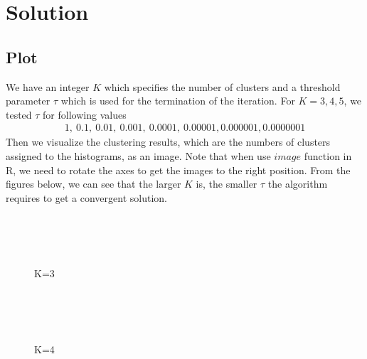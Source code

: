 \documentclass[letterpaper,hidelinks]{article}
\numberwithin{equation}{section}
\begin{document}
\section{Solution}
\subsection{Plot}
We have an integer $K$ which specifies the number of clusters and a threshold parameter $\tau$ which is used for the termination of the iteration. For $K=3,4,5$, we tested $\tau$ for following values
\begin{align}
1,~0.1,~0.01,~0.001,~0.0001,~0.00001,0.000001,0.0000001
\end{align}
Then we visualize the clustering results, which are the numbers of clusters assigned to the histograms, as an image. Note that when use $image$ function in R, we need to rotate the axes to get the images to the right position. From the figures below, we can see that the larger $K$ is, the smaller $\tau$ the algorithm requires to get a convergent solution.
\begin{figure}
\centering
\subfigure[$\tau$=1]{\texttt{[image: 13]}}
\hspace{0.1in}
\subfigure[$\tau$=0.1]{\texttt{[image: 14]}}
\\
\subfigure[$\tau$=0.01]{\texttt{[image: 15]}}
\hspace{0.1in}
\subfigure[$\tau$=0.001]{\texttt{[image: 16]}}
\\
\subfigure[$\tau$=0.0001]{\texttt{[image: 17]}}
\hspace{0.1in}
\subfigure[$\tau$=0.00001]{\texttt{[image: 18]}}
\\
\subfigure[$\tau$=0.000001]{\texttt{[image: 19]}}
\hspace{0.1in}
\subfigure[$\tau$=0.0000001]{\texttt{[image: 110]}}
\caption{K=3}
\end{figure}
\begin{figure}
\centering
\subfigure[$\tau$=1]{\texttt{[image: 23]}}
\hspace{0.1in}
\subfigure[$\tau$=0.1]{\texttt{[image: 24]}}
\\
\subfigure[$\tau$=0.01]{\texttt{[image: 25]}}
\hspace{0.1in}
\subfigure[$\tau$=0.001]{\texttt{[image: 26]}}
\\
\subfigure[$\tau$=0.0001]{\texttt{[image: 27]}}
\hspace{0.1in}
\subfigure[$\tau$=0.00001]{\texttt{[image: 28]}}
\\
\subfigure[$\tau$=0.000001]{\texttt{[image: 29]}}
\hspace{0.1in}
\subfigure[$\tau$=0.0000001]{\texttt{[image: 210]}}
\caption{K=4}
\end{figure}
\end{document}
